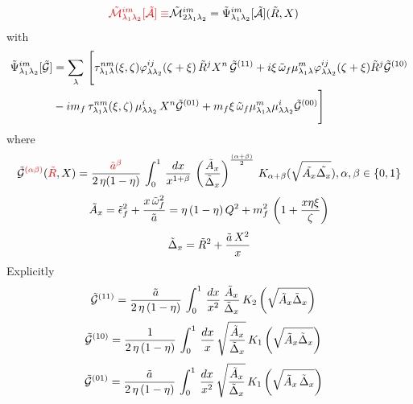 \documentclass[9pt]{article}
\newcommand{\chg}[1]{{\color{red}#1}}
\numberwithin{equation}{section}
\begin{document}
\begin{align}
\chg{\mathcal{\Tilde{M}}^{im}_{\lambda_{1}\lambda_{2}}[\mathcal{\Tilde{A}}] \equiv} \mathcal{\Tilde{M}}^{im}_{2\lambda_{1}\lambda_{2}} &  = \Tilde{\Psi}^{im}_{\lambda_{1}\lambda_{2}}[\mathcal{\Tilde{A}}] (\Tilde{R},X)
\label{chg:M2q}\end{align}
with 
\begin{align}
    \Tilde{\Psi}^{im}_{\lambda_{1}\lambda_{2}}[\mathcal{\Tilde{G}}] & = \sum_{\lambda}\, \Bigg[\tau^{nm}_{\lambda_{1}\lambda}(\xi,\zeta)\varphi^{ij}_{\lambda\lambda_{2}}(\zeta + \xi)\,\Tilde{R}^{j}X^{n}\,\mathcal{\Tilde{G}}^{(11)}+i\xi\,\Tilde{\omega}_{f}\mu^{m}_{\lambda_{1}\lambda}\varphi^{ij}_{\lambda\lambda_{2}}(\zeta + \xi)\Tilde{R}^{j}\mathcal{\Tilde{G}}^{(10)}\notag \\ & -im_{f}\,\tau^{nm}_{\lambda_{1}\lambda}(\xi,\zeta)\,\mu^{i}_{\lambda\lambda_{2}}\,X^{n}\mathcal{\Tilde{G}}^{(01)} + m_{f}\xi\,\Tilde{\omega}_{f}\mu^{m}_{\lambda_{1}\lambda}\mu^{i}_{\lambda\lambda_{2}}\mathcal{\Tilde{G}}^{(00)}\Bigg]
\end{align}
where
\label{chg:abetaqb}$$\mathcal{\Tilde{G}}^{\chg{(\alpha\beta)}}(\chg{\Tilde{R}},X) = \frac{\chg{\Tilde{a}^{\beta}}}{2\,\eta(1-\eta)}\,\int_{0}^{1}\, \frac{dx}{x^{1+\beta}}\, \left(\frac{\Tilde{A}_{x}}{\Tilde{\Delta}_{x}}\right)^{\frac{(\alpha + \beta)}{2}}\,K_{\alpha + \beta} (\sqrt{\Tilde{A_{x}}\Tilde{\Delta_{x}}}), \alpha, \beta \in \{0,1\}$$
$$\Tilde{A}_{x} = \Tilde{\epsilon}^{2}_{f} + \frac{x\,\Tilde{\omega}^{2}_{f}}{\Tilde{a}} = \eta\,(1-\eta)\,Q^{2} +m^{2}_{f}\,\left(1+\frac{x\eta\xi}{\zeta}\right)$$
$$\Tilde{\Delta}_{x} = \Tilde{R}^{2} + \frac{\Tilde{a}\,X^{2}}{x}$$
\label{chg:ty3d}\chg{Explicitly}
\begin{align}
    \mathcal{\Tilde{G}}^{(11)} & = \frac{\Tilde{a}}{2\,\eta\, (1-\eta)}\, \int_{0}^{1}\, \frac{dx}{x^{2}}\, \frac{\Tilde{A}_{x}}{\Tilde{\Delta}_{x}}\,K_{2}\left(\sqrt{\Tilde{A}_{x}\Tilde{\Delta}_{x}}\right)
\end{align}
\begin{align}
    \mathcal{\Tilde{G}}^{(10)} & = \frac{1}{2\, \eta\, (1-\eta)}\, \int_{0}^{1}\, \frac{dx}{x}\, \sqrt{\frac{\Tilde{A}_{x}}{\Tilde{\Delta}_{x}}}\, K_{1}\left(\sqrt{\Tilde{A}_{x}\Tilde{\Delta}_{x}}\right)
\end{align}
\begin{align}
     \mathcal{\Tilde{G}}^{(01)} & = \frac{\Tilde{a}}{2\, \eta\, (1-\eta)}\, \int_{0}^{1}\, \frac{dx}{x^{2}}\, \sqrt{\frac{\Tilde{A}_{x}}{\Tilde{\Delta}_{x}}}\, K_{1}\left(\sqrt{\Tilde{A}_{x}\,\Tilde{\Delta}_{x}}\right)
\end{align}
\end{document}
